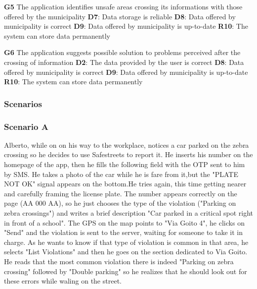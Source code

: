 \begin{outline}

    \1 \textbf{G5} The application identifies unsafe areas crossing 
    its informations with those offered by the municipality
    \2 \textbf{D7}: Data storage is reliable
    \2 \textbf{D8}: Data offered by municipality is correct
    \2 \textbf{D9}: Data offered by municipality is up-to-date
    \2 \textbf{R10}: The system can store data permanently 


    \1 \textbf{G6} The application suggests possible solution to 
    problems perceived after the crossing of information
    \2 \textbf{D2}: The data provided by the user is correct
    \2 \textbf{D8}: Data offered by municipality is correct
    \2 \textbf{D9}: Data offered by municipality is up-to-date
    \2 \textbf{R10}: The system can store data permanently 


\end{outline}

\subsubsection{Scenarios}

\subsubsection*{Scenario A}

Alberto, while on on his way to the workplace, notices a car parked 
on the zebra crossing so he decides to use Safestreets to report it. 
He inserts his number on the homepage of the app, then he fills the 
following field with the OTP sent to him by SMS. He takes a photo of 
the car while he is fare from it,but the "PLATE NOT OK" signal appears 
on the bottom.He tries again, this time getting nearer and carefully 
framing the license plate. The number appears correctly on the page 
(AA 000 AA), so he just chooses the type of the violation ("Parking on 
zebra crossings") and writes a brief description "Car parked in a critical 
spot right in front of a school". The GPS on the map points to "Via Goito 4", 
he clicks on "Send" and the violation is sent to the server, waiting for someone 
to take it in charge.
As he wants to know if that type of violation is common in that area, he selects 
"List Violations" and then he goes on the section dedicated to Via Goito. He 
reads that the most common violation there is indeed "Parking on zebra crossing" 
followed by "Double parking" so he realizes that he should look out for these 
errors while waling on the street.

